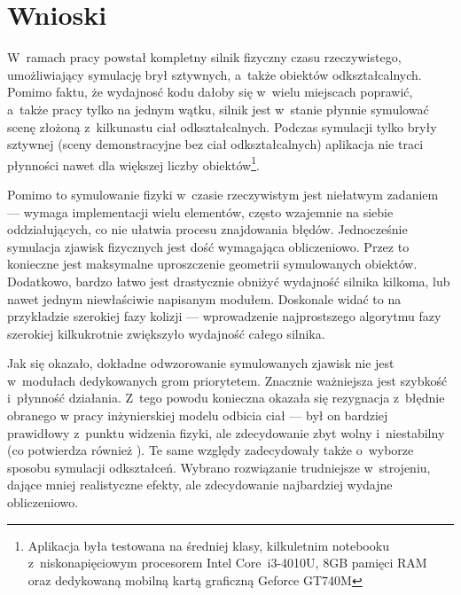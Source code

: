 
\chapter{Wnioski} 
W~ramach pracy powstał kompletny silnik fizyczny czasu rzeczywistego, umożliwiający symulację brył sztywnych, a~także obiektów odkształcalnych. Pomimo faktu, że wydajnosć kodu dałoby się w~wielu miejscach poprawić, a~także pracy tylko na jednym wątku, silnik jest w~stanie płynnie symulować scenę złożoną z~kilkunastu ciał odkształcalnych. Podczas symulacji tylko bryły sztywnej (sceny demonstracyjne bez ciał odkształcalnych) aplikacja nie traci płynności nawet dla większej liczby obiektów\footnote{Aplikacja była testowana na średniej klasy, kilkuletnim notebooku z~niskonapięciowym procesorem Intel Core~i3-4010U, 8GB pamięci RAM oraz dedykowaną mobilną kartą graficzną Geforce GT740M}.

Pomimo to symulowanie fizyki w~czasie rzeczywistym jest niełatwym zadaniem --- wymaga implementacji wielu elementów, często wzajemnie na siebie oddziałujących, co nie ułatwia procesu znajdowania błędów. Jednocześnie symulacja zjawisk fizycznych jest dość wymagająca obliczeniowo. Przez to konieczne jest maksymalne uproszczenie geometrii symulowanych obiektów. Dodatkowo, bardzo łatwo jest drastycznie obniżyć wydajność silnika kilkoma, lub nawet jednym niewłaściwie napisanym modułem. Doskonale widać to na przykładzie szerokiej fazy kolizji --- wprowadzenie najprostszego algorytmu fazy szerokiej kilkukrotnie zwiększyło wydajność całego silnika.

Jak się okazało, dokładne odwzorowanie symulowanych zjawisk nie jest w~modułach dedykowanych grom priorytetem. Znacznie ważniejsza jest szybkość i~płynność działania. Z~tego powodu konieczna okazała się rezygnacja z~błędnie obranego w pracy inżynierskiej modelu odbicia ciał --- był on bardziej prawidłowy z~punktu widzenia fizyki, ale zdecydowanie zbyt wolny i~niestabilny (co potwierdza również \cite{bib:mirtich-penalty-impulse}). Te same względy zadecydowały także o~wyborze sposobu symulacji odkształceń. Wybrano rozwiązanie trudniejsze w~strojeniu, dające mniej realistyczne efekty, ale zdecydowanie najbardziej wydajne obliczeniowo.

